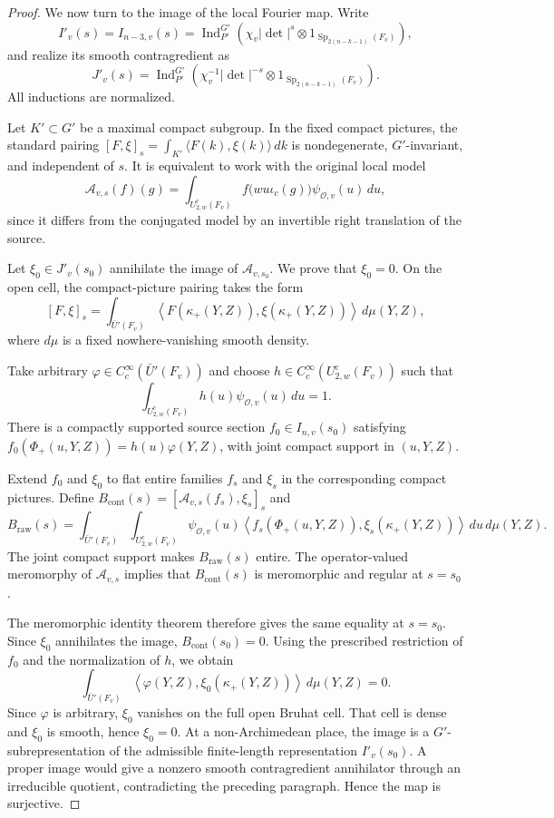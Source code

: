 \documentclass[11pt,notitlepage]{amsart}
\theoremstyle{definition}
\theoremstyle{remark}
\newcommand{\calO}{\mathcal{O}}
\DeclareMathOperator{\Sp}{Sp}
\DeclareMathOperator{\Ind}{Ind}
\begin{document}
\begin{proof}
We now turn to the image of the local Fourier map. Write
\[
I'_v(s)=I_{n-3,v}(s)
=
\Ind_{P'}^{G'}
\left(
\chi_v|\det|^s
\otimes1_{\Sp_{2(n-k-1)}(F_v)}
\right),
\]
and realize its smooth contragredient as
\[
J'_v(s)
=
\Ind_{P'}^{G'}
\left(
\chi_v^{-1}|\det|^{-s}
\otimes1_{\Sp_{2(n-k-1)}(F_v)}
\right).
\]
All inductions are normalized.

Let \(K'\subset G'\) be a maximal compact subgroup. In the fixed compact
pictures, the standard pairing
$[F,\xi]_s
=
\int_{K'}\langle F(k),\xi(k)\rangle\,dk$ is nondegenerate, \(G'\)-invariant, and independent of \(s\). It is equivalent to work with the original local model
\[
\mathcal A_{v,s}(f)(g)
=
\int_{U_{2,w}^{\mathrm{c}}(F_v)}
f\bigl(wu\iota_c(g)\bigr)
\psi_{\calO,v}(u)\,du,
\]
since it differs from the conjugated model by an invertible right
translation of the source.

Let \(\xi_0\in J'_v(s_0)\) annihilate the image of
\(\mathcal A_{v,s_0}\). We prove that \(\xi_0=0\). On the open cell, the
compact-picture pairing takes the form
\[
[F,\xi]_s
=
\int_{\bar U'(F_v)}
\left\langle
F(\kappa_+(Y,Z)),
\xi(\kappa_+(Y,Z))
\right\rangle
\,d\mu(Y,Z),
\]
where \(d\mu\) is a fixed nowhere-vanishing smooth density.

Take arbitrary $\varphi\in C_c^\infty(\bar U'(F_v))$ and choose $h\in C_c^\infty(U_{2,w}^{\mathrm{c}}(F_v))$ such that
\[
\int_{U_{2,w}^{\mathrm{c}}(F_v)}
h(u)\psi_{\calO,v}(u)\,du=1.
\]
There is a compactly supported
source section \(f_0\in I_{n,v}(s_0)\) satisfying $f_0(\Phi_+(u,Y,Z))=h(u)\varphi(Y,Z)$, with joint compact support in \((u,Y,Z)\).

Extend \(f_0\) and \(\xi_0\) to flat entire families \(f_s\) and \(\xi_s\)
in the corresponding compact pictures. Define $B_{\mathrm{cont}}(s)
=
[\mathcal A_{v,s}(f_s),\xi_s]_s$ and
\[
B_{\mathrm{raw}}(s)
=
\int_{\bar U'(F_v)}
\int_{U_{2,w}^{\mathrm{c}}(F_v)}
\psi_{\calO,v}(u)
\left\langle
f_s(\Phi_+(u,Y,Z)),
\xi_s(\kappa_+(Y,Z))
\right\rangle
\,du\,d\mu(Y,Z).
\]
The joint compact support makes \(B_{\mathrm{raw}}(s)\) entire.
The operator-valued meromorphy of \(\mathcal A_{v,s}\) implies that
\(B_{\mathrm{cont}}(s)\) is meromorphic and regular at \(s=s_0\).

The meromorphic identity theorem therefore gives the same equality at
\(s=s_0\). Since \(\xi_0\) annihilates the image, $B_{\mathrm{cont}}(s_0)=0$. Using the prescribed restriction of \(f_0\) and the normalization of
\(h\), we obtain
\[
\int_{\bar U'(F_v)}
\left\langle
\varphi(Y,Z),
\xi_0(\kappa_+(Y,Z))
\right\rangle
\,d\mu(Y,Z)=0.
\]
Since \(\varphi\) is arbitrary, \(\xi_0\) vanishes on the full open
Bruhat cell. That cell is dense and \(\xi_0\) is smooth, hence
$\xi_0=0$. At a non-Archimedean place, the image is a \(G'\)-subrepresentation of
the admissible finite-length representation \(I'_v(s_0)\). A proper
image would give a nonzero smooth contragredient annihilator through an
irreducible quotient, contradicting the preceding paragraph. Hence the
map is surjective.


\end{proof}
\end{document}
